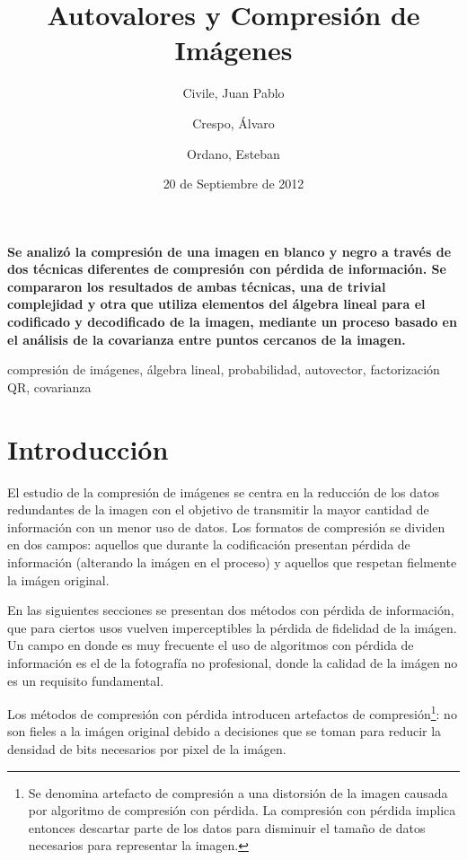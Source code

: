 \documentclass[twocolumn,a4paper,10pt]{article}
\title{Autovalores y Compresión de Imágenes}
\date{20 de Septiembre de 2012}
\author{Civile, Juan Pablo \and Crespo, Álvaro \and Ordano, Esteban }
\begin{document}
\pagestyle{fancy}
\maketitle
\thispagestyle{fancy}

\begin{customabstract}
\textbf{
    Se analizó la compresión de una imagen en blanco y negro a través de dos técnicas diferentes de compresión con pérdida de información.
    Se compararon los resultados de ambas técnicas, una de trivial complejidad y otra que utiliza elementos del álgebra lineal para el codificado
    y decodificado de la imagen, mediante un proceso basado en el análisis de la covarianza entre puntos cercanos de la imagen.
}
\end{customabstract}

\begin{keywords}
compresi\'on de im\'agenes, \'algebra lineal, probabilidad, autovector, factorizaci\'on QR, covarianza
\end{keywords}


\section{Introducci\'on}

El estudio de la compresi\'on de im\'agenes se centra en la reducci\'on de los datos redundantes de la imagen con el objetivo de transmitir la mayor cantidad de información con un menor uso de datos. Los formatos de compresi\'on se dividen en dos campos: aquellos que durante la codificación presentan p\'erdida de información (alterando la imágen en el proceso) y aquellos que respetan fielmente la imágen original.

En las siguientes secciones se presentan dos métodos con pérdida de información, que para ciertos usos vuelven imperceptibles la pérdida de fidelidad de la imágen. Un campo en donde es muy frecuente el uso de algoritmos con pérdida de información es el de la fotografía no profesional, donde la calidad de la imágen no es un requisito fundamental.

Los métodos de compresión con p\'erdida introducen artefactos de compresión\footnote{Se denomina artefacto de compresi\'on a una distorsión de la imagen causada por algoritmo de compresi\'on con p\'erdida. La compresi\'on con p\'erdida implica entonces descartar parte de los datos para disminuir el tamaño de datos necesarios para representar la imagen.}: no son fieles a la imágen original debido a decisiones que se toman para reducir la densidad de bits necesarios por pixel de la imágen.
\end{document}
